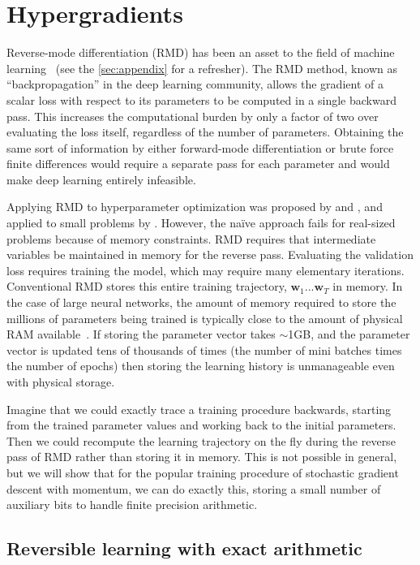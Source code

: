\documentclass{article}
\newcommand{\vw}{\mathbf{w}}
\newcommand{\primal}{elementary}
\newcommand{\params}{\vw}
\begin{document}
\section{Hypergradients}
\label{sec:hypergradients}

Reverse-mode differentiation (RMD) has been an asset to the field of machine
learning~\citep{lecun1989backpropagation} (see the \ref{sec:appendix} for a refresher). The RMD method, known as
``backpropagation'' in the deep learning community, allows the gradient of a
scalar loss with respect to its parameters to be computed in a single backward
pass.
This increases the computational burden by only a factor of two over
evaluating the loss itself, regardless of the number of parameters.
Obtaining the same sort of information by either forward-mode
differentiation or brute force finite differences would require a separate pass
for each parameter and would make deep learning entirely infeasible.

Applying RMD to hyperparameter optimization was proposed by \citet{bengio2000gradient} and \citet{Autodiff14}, and applied to small problems by \citet{domke2012generic}.
However, the na\"ive approach fails for real-sized problems because
of memory constraints. RMD requires that intermediate variables be maintained
in memory for the reverse pass. Evaluating the validation loss
requires training the model, which may require many \primal{} iterations. Conventional
RMD stores this entire training trajectory, $\params_1
... \params_T$ in memory.  In the case of large neural networks, the amount of
memory required to store the millions of parameters being trained is typically
close to the amount of physical RAM available~\cite{sequence2014}. If storing
the parameter vector takes $\sim$1GB, and the parameter vector is updated tens
of thousands of times (the number of mini batches times the number of
epochs) then storing the learning history is unmanageable even with
physical storage.

Imagine that we could exactly trace a training
procedure backwards, starting from the trained parameter values and working
back to the initial parameters. Then we could recompute the learning trajectory
on the fly during the reverse pass of RMD rather than storing it in memory. This is
not possible in general, but we will show that for the popular training
procedure of stochastic gradient descent with momentum, we can do
exactly this, storing a small number of auxiliary bits to handle
finite precision arithmetic.

\subsection{Reversible learning with exact arithmetic}
\label{sec:reversible learning}
\end{document}
